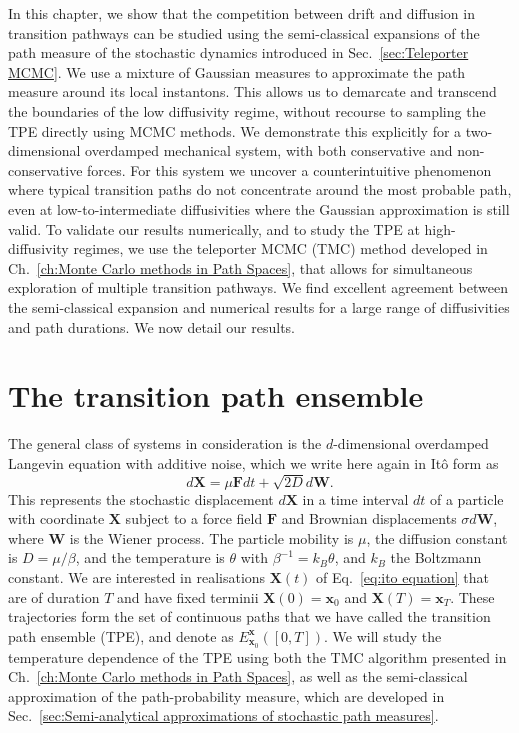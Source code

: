 In this chapter, we show that the competition between drift and diffusion
in transition pathways can be studied using the semi-classical expansions
of the path measure of the stochastic dynamics introduced in Sec.~\ref{sec:Teleporter MCMC}. We use a mixture of
Gaussian measures to approximate the path measure around its local
instantons. This allows us to demarcate and transcend the boundaries
of the low diffusivity regime, without recourse to sampling the TPE directly using MCMC methods. We demonstrate this explicitly for
a two-dimensional overdamped mechanical system, with both conservative
and non-conservative forces. For this system we uncover a counterintuitive
phenomenon where typical transition paths do not concentrate around
the most probable path, even at low-to-intermediate diffusivities
where the Gaussian approximation is still valid. To validate our results
numerically, and to study the TPE at high-diffusivity regimes, we use the teleporter MCMC (TMC) method developed in Ch.~\ref{ch:Monte Carlo methods in Path Spaces},
that allows for simultaneous exploration of multiple transition pathways. We
find excellent agreement between the semi-classical expansion and
numerical results for a large range of diffusivities and path durations.
We now detail our results.

\section{The transition path ensemble}

The general class of systems in consideration is the $d$-dimensional overdamped Langevin equation with additive noise, which we write here again in Itô form as
\begin{equation} \label{eq:ito equation again}
d\mathbf{X}=\mu\mathbf{F}dt+\sqrt{2D}d\mathbf{W}. 
\end{equation}
This represents the stochastic displacement $d\mathbf{X}$ in a time
interval $dt$ of a particle with coordinate $\mathbf{X}$ subject
to a force field $\mathbf{F}$ and Brownian displacements $\sigma d\mathbf{W}$,
where $\mathbf{W}$ is the Wiener process. The particle mobility is
$\mu$, the diffusion constant is $D=\mu/\beta$, and the temperature
is $\theta$ with $\beta^{-1}=k_{B}\theta$, and $k_{B}$ the Boltzmann
constant. We are interested in realisations $\mathbf{X}(t)$ of Eq.~\ref{eq:ito equation}
that are of duration $T$ and have fixed terminii $\mathbf{X}(0)=\mathbf{x}_{0}$
and $\mathbf{X}(T)=\mathbf{x}_{T}$. These trajectories form the set
of continuous paths that we have called the transition path ensemble (TPE), and denote as $E_{\mathbf{x}_0}^{\mathbf{x}}([0,T])$. We will study the temperature dependence of the TPE using both the TMC algorithm presented in Ch.~\ref{ch:Monte Carlo methods in Path Spaces}, as well as the semi-classical approximation of the path-probability measure, which are developed in Sec.~\ref{sec:Semi-analytical approximations of stochastic path measures}.

